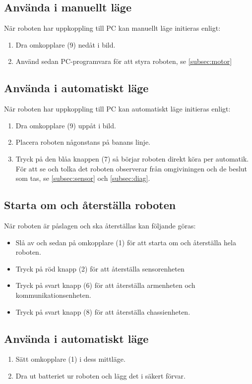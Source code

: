 \documentclass[a4paper,12pt]{article}
\begin{document}
\subsection{Använda i manuellt läge}
När roboten har uppkoppling till PC kan manuellt läge initieras enligt:
\begin{enumerate}
    \item Dra omkopplare (9) nedåt i bild.
    \item Använd sedan PC-programvara för att styra roboten, se \ref{subsec:motor}
\end{enumerate}

\subsection{Använda i automatiskt läge}
När roboten har uppkoppling till PC kan automatiskt läge initieras enligt:
\begin{enumerate}
    \item Dra omkopplare (9) uppåt i bild.
    \item Placera roboten någonstans på banans linje. 
    \item Tryck på den blåa knappen (7) så börjar roboten direkt köra per automatik. För att se och tolka det roboten observerar från omgiviningen och de beslut som tas, se \ref{subsec:sensor} och \ref{subsec:diag}.
\end{enumerate}

\subsection{Starta om och återställa roboten}
När roboten är påslagen och ska återställas kan följande göras:
\begin{itemize}
\item Slå av och sedan på omkopplare (1) för att starta om och återställa hela roboten.
\item Tryck på röd knapp (2) för att återställa sensorenheten
\item Tryck på svart knapp (6) för att återställa armenheten och kommunikationsenheten.
\item Tryck på svart knapp (8) för att återställa chassienheten. 
\end{itemize}

\subsection{Använda i automatiskt läge}
\begin{enumerate}
    \item Sätt omkopplare (1) i dess mittläge.
    \item Dra ut batteriet ur roboten och lägg det i säkert förvar.
\end{enumerate}
\end{document}
